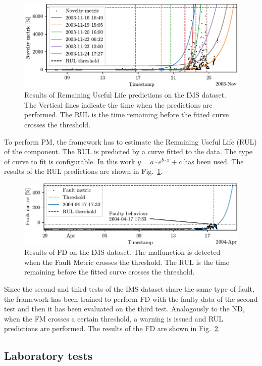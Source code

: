 \begin{figure}
    \includegraphics[width=\linewidth]{images/RUL_IMS.pdf}
    \caption{Results of Remaining Useful Life predictions on the IMS dataset. The Vertical lines indicate the time when the predictions are performed. The RUL is the time remaining before the fitted curve crosses the threshold.}
    \label{fig:RUL_IMS}
\end{figure}
To perform PM, the framework has to estimate the Remaining Useful Life (RUL) of the component. The RUL is predicted by a curve fitted to the data. The type of curve to fit is configurable. In this work $y = a \cdot e^{b \cdot x} + c$ has been used. The results of the RUL predictions are shown in Fig.~\ref{fig:RUL_IMS}.

\begin{figure}
    \includegraphics[width=\linewidth]{images/FD_IMS.pdf}
    \caption{Results of FD on the IMS dataset. The malfunction is detected when the Fault Metric crosses the threshold. The RUL is the time remaining before the fitted curve crosses the threshold.}
    \label{fig:FD_IMS}
\end{figure}
Since the second and third tests of the IMS dataset share the same type of fault, the framework has been trained to perform FD with the faulty data of the second test and then it has been evaluated on the third test. Analogously to the ND, when the FM crosses a certain threshold, a warning is issued and RUL predictions are performed. The results of the FD are shown in Fig.~\ref{fig:FD_IMS}.

\subsection{Laboratory tests}

